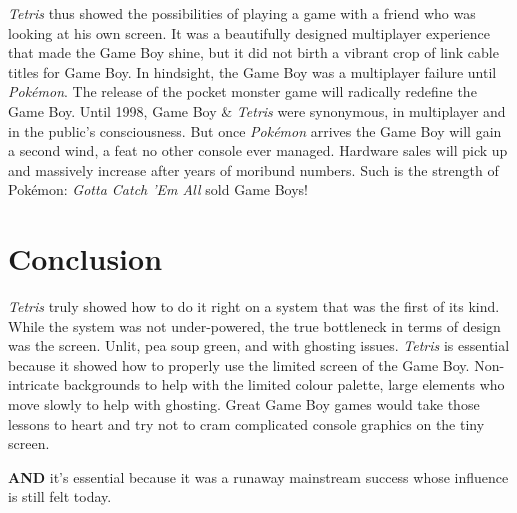 \documentclass{book}
\begin{document}
\emph{Tetris} thus showed the possibilities of playing a game with a friend who was looking at his own screen. It was a beautifully designed multiplayer experience that made the Game Boy shine, but it did not birth a vibrant crop of link cable titles for Game Boy. In hindsight, the Game Boy was a multiplayer failure until \emph{Pokémon}. The release of the pocket monster game will radically redefine the Game Boy. Until 1998, Game Boy \& \emph{Tetris} were synonymous, in multiplayer and in the public’s consciousness. But once \emph{Pokémon} arrives the Game Boy will gain a second wind, a feat no other console ever managed. Hardware sales will pick up and massively increase after years of moribund numbers. Such is the strength of Pokémon: \emph{Gotta Catch ’Em All} sold Game Boys!

\FloatBarrier\needspace{10mm}\section*{Conclusion}\nopagebreak[4]

\emph{Tetris} truly showed how to do it right on a system that was the first of its kind. While the system was not under-powered, the true bottleneck in terms of design was the screen. Unlit, pea soup green, and with ghosting issues. \emph{Tetris} is essential because it showed how to properly use the limited screen of the Game Boy. Non-intricate backgrounds to help with the limited colour palette, large elements who move slowly to help with ghosting. Great Game Boy games would take those lessons to heart and try not to cram complicated console graphics on the tiny screen.

\textbf{AND} it’s essential because it was a runaway mainstream success whose influence is still felt today.
\end{document}
